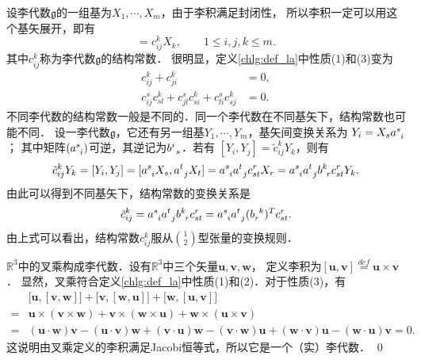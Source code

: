 设李代数$\mathfrak{g}$的一组基为$X_1, \cdots ,X_m$，由于李积满足封闭性，
所以李积一定可以用这个基矢展开，即有
\begin{equation}
    [X_i, X_j] =c_{ij}^k X_k, \qquad 1 \leqslant i,j,k \leqslant m .
\end{equation}
其中$c_{ij}^k$称为李代数$\mathfrak{g}$的{\heiti 结构常数}．
很明显，定义\ref{chlg:def_la}中性质(1)和(3)变为
\begin{align}
    c_{ij}^k +c_{ji}^k &= 0, \label{chlg:eqn_Cij=Cji} \\
    c_{ij}^s c_{sl}^k + c_{jl}^s c_{si}^k + c_{li}^s c_{sj}^k &=0. \label{chlg:eqn_CCC}
\end{align}
不同李代数的结构常数一般是不同的．同一个李代数在不同基矢下，结构常数也可能不同．
设一李代数$\mathfrak{g}$，它还有另一组基$Y_1, \cdots ,Y_m$，基矢间变换关系为
$    Y_i = X_s a_{\hphantom{s} i}^s  $；
其中矩阵$(a_{\hphantom{s} i}^s)$可逆，其逆记为$b_{\hphantom{s} s}^i$．若有
$    [Y_i, Y_j] =\tilde{c}^{k}_{ij} Y_k $，则有
\begin{equation}
    \tilde{c}^{k}_{ij} Y_k= [Y_i, Y_j] = [a_{\hphantom{s} i}^s X_s, a_{\hphantom{s} j}^t X_t]
    =a_{\hphantom{s} i}^s a_{\hphantom{s} j}^t c_{st}^r X_r
    =a_{\hphantom{s} i}^s a_{\hphantom{s} j}^t b^k_{\hphantom{s} r} c_{st}^r Y_k .
\end{equation}
由此可以得到不同基矢下，结构常数的变换关系是
\begin{equation}\label{chlg:eqn_LAC-trans}
    \tilde{c}^{k}_{ij}  =a_{\hphantom{s} i}^s a_{\hphantom{s} j}^t b^k_{\hphantom{s} r} c_{st}^r 
    =a_{\hphantom{s} i}^s a_{\hphantom{s} j}^t (b^{\hphantom{s} k}_{r})^T c_{st}^r  .
\end{equation}
由上式可以看出，结构常数$c^k_{ij}$服从$\binom{1}{2}$型张量的变换规则．

\begin{example}
    $\mathbb{R}^3$中的叉乘构成李代数．设有$\mathbb{R}^3$中三个矢量$\boldsymbol{u},\boldsymbol{v},\boldsymbol{w}$，
    定义李积为$[\boldsymbol{u},\boldsymbol{v}]\overset{def}{=}\boldsymbol{u} \times \boldsymbol{v}$．
    显然，叉乘符合定义\ref{chlg:def_la}中性质(1)和(2)．对于性质(3)，有
    \begin{align*}
        &\bigl[\boldsymbol{u},[\boldsymbol{v},\boldsymbol{w}]\bigr]
        +\bigl[\boldsymbol{v},[\boldsymbol{w},\boldsymbol{u}]\bigr]+\bigl[\boldsymbol{w},
        [\boldsymbol{u},\boldsymbol{v}]\bigr] \\
      =& \boldsymbol{u} \times (\boldsymbol{v}\times \boldsymbol{w})+\boldsymbol{v} \times 
      (\boldsymbol{w}\times \boldsymbol{u})+\boldsymbol{w} \times (\boldsymbol{u}\times \boldsymbol{v}) \\
      =& (\boldsymbol{u}\cdot\boldsymbol{w}) \boldsymbol{v}  - (\boldsymbol{u}\cdot\boldsymbol{v}) \boldsymbol{w}
        +(\boldsymbol{v}\cdot\boldsymbol{u}) \boldsymbol{w}  - (\boldsymbol{v}\cdot\boldsymbol{w}) \boldsymbol{u}
        +(\boldsymbol{w}\cdot\boldsymbol{v}) \boldsymbol{u}  - (\boldsymbol{w}\cdot\boldsymbol{u}) \boldsymbol{v} = 0 .
    \end{align*}
    这说明由叉乘定义的李积满足Jacobi恒等式，所以它是一个（实）李代数． \qed
\end{example}

